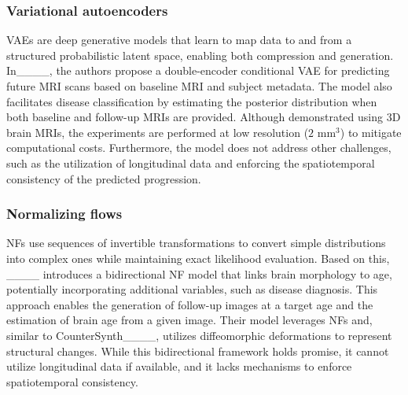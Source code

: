 \subsubsection{Variational autoencoders}
VAEs are deep generative models that learn to map data to and from a structured probabilistic latent space, enabling both compression and generation. In____, the authors propose a double-encoder conditional VAE for predicting future MRI scans based on baseline MRI and subject metadata. The model also facilitates disease classification by estimating the posterior distribution when both baseline and follow-up MRIs are provided. Although demonstrated using 3D brain MRIs, the experiments are performed at low resolution ($2\text{ mm}^3$) to mitigate computational costs. Furthermore, the model does not address other challenges, such as the utilization of longitudinal data and enforcing the spatiotemporal consistency of the predicted progression.

\subsubsection{Normalizing flows}
NFs use sequences of invertible transformations to convert simple distributions into complex ones while maintaining exact likelihood evaluation. Based on this, ____ introduces a bidirectional NF model that links brain morphology to age, potentially incorporating additional variables, such as disease diagnosis. This approach enables the generation of follow-up images at a target age and the estimation of brain age from a given image. Their model leverages NFs and, similar to CounterSynth____, utilizes diffeomorphic deformations to represent structural changes. While this bidirectional framework holds promise, it cannot utilize longitudinal data if available, and it lacks mechanisms to enforce spatiotemporal consistency.


